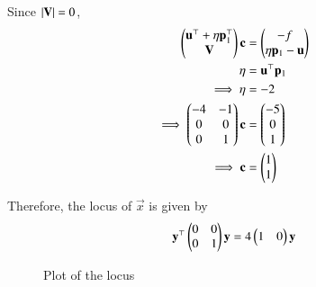 \documentclass[journal,12pt,twocolumn]{IEEEtran}
\begin{document}
Since $\vert\mathbf{V}\vert = 0$,
\begin{align}
    \begin{pmatrix}\mathbf{u}^\top+\eta \mathbf{p}_1^\top\\\mathbf{V}\end{pmatrix}\mathbf{c} &= \begin{pmatrix}-f\\\eta \mathbf{p}_1-\mathbf{u}\end{pmatrix}\\
    \eta &= \mathbf{u}^\top \mathbf{p}_1\\
    \implies \eta &= -2\\
    \implies \begin{pmatrix}-4&-1\\0&0\\0&1\end{pmatrix}\mathbf{c} &= \begin{pmatrix}-5\\0\\1\end{pmatrix}\\
    \implies \mathbf{c} &= \begin{pmatrix}1\\1\end{pmatrix}
\end{align}

Therefore, the locus of $\vec{x}$ is given by
\begin{align}
    \mathbf{y}^\top \begin{pmatrix}0&0\\0&1\end{pmatrix}\mathbf{y} = 4\begin{pmatrix}1&0\end{pmatrix}\mathbf{y}
\end{align}

\begin{figure}[h]
    \centering
    \caption{Plot of the locus}
\end{figure}
\end{document}
